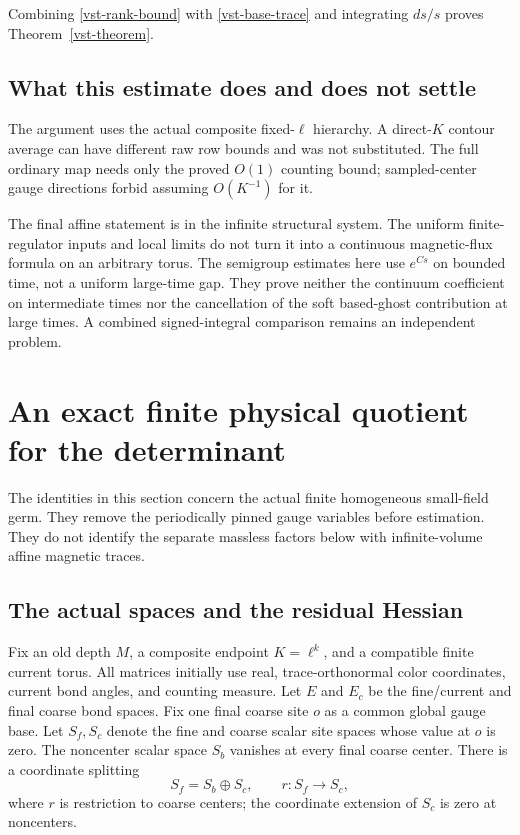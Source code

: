 \documentclass[11pt]{article}
\theoremstyle{remark}
\begin{document}
Combining \eqref{vst-rank-bound} with
\eqref{vst-base-trace} and integrating \(ds/s\)
proves Theorem~\ref{vst-theorem}.

\subsection{What this estimate does and does not settle}
\label{vst-scope}

The argument uses the actual composite fixed-\(\ell\)
hierarchy. A direct-\(K\) contour average can have
different raw row bounds and was not substituted.
The full ordinary map needs only the proved
\(O(1)\) counting bound; sampled-center gauge
directions forbid assuming \(O(K^{-1})\) for it.

The final affine statement is in the infinite
structural system. The uniform finite-regulator
inputs and local limits do not turn it into a
continuous magnetic-flux formula on an arbitrary
torus. The semigroup estimates here use \(e^{Cs}\)
on bounded time, not a uniform large-time gap.
They prove neither the continuum coefficient on
intermediate times nor the cancellation of the
soft based-ghost contribution at large times.
A combined signed-integral comparison remains
an independent problem.


\section{An exact finite physical quotient for the determinant}
\label{pqd-section}

The identities in this section concern the actual finite homogeneous
small-field germ. They remove the periodically pinned gauge variables
before estimation. They do not identify the separate massless factors
below with infinite-volume affine magnetic traces.

\subsection{The actual spaces and the residual Hessian}
\label{pqd-spaces}

Fix an old depth $M$, a composite endpoint $K=\ell^k$, and a compatible
finite current torus. All matrices initially use real, trace-orthonormal
color coordinates, current bond angles, and counting measure. Let $E$
and $E_c$ be the fine/current and final coarse bond spaces. Fix one final
coarse site $o$ as a common global gauge base. Let $S_f,S_c$ denote the
fine and coarse scalar site spaces whose value at $o$ is zero. The
noncenter scalar space $S_b$ vanishes at every final coarse center.
There is a coordinate splitting
\begin{equation}
 S_f=S_b\oplus S_c,\qquad r:S_f\longrightarrow S_c,
 \label{pqd-scalar-split}
\end{equation}
where $r$ is restriction to coarse centers; the coordinate extension of
$S_c$ is zero at noncenters.
\end{document}
